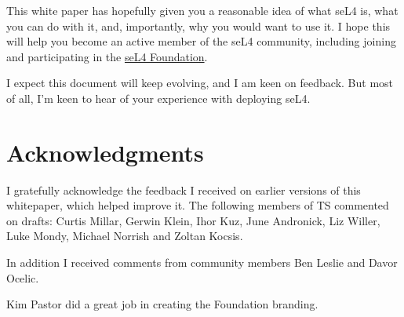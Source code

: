 \documentclass[english,a4paper,12pt]{report}
\newcommand{\Acks}{\section*{Acknowledgments}}
\newcommand{\Acks}{\chapter*{Acknowledgments}}
\begin{document}
  This white paper has hopefully given you a reasonable idea of what
  seL4 is, what you can do with it, and, importantly, why you would
  want to use it. I hope this will help you become an active member of
  the seL4 community, including joining and participating in the
  \href{https://sel4.systems/Foundation}{seL4 Foundation}.

  I expect this document will keep evolving, and I am keen on
  feedback. But most of all, I'm keen to hear of your experience with
  deploying seL4.


  \Acks

  I gratefully acknowledge the feedback I received on earlier versions
  of this whitepaper, which helped improve it. The following members of TS commented on drafts:
  Curtis Millar,
  Gerwin Klein,
  Ihor Kuz,
  June Andronick,
  Liz Willer,
  Luke Mondy,
  Michael Norrish and
  Zoltan Kocsis.

  In addition I received comments from community members
  Ben Leslie and
  Davor Ocelic.

  Kim Pastor did a great job in creating the Foundation branding.
  \cleardoublepage
  \sloppy
  
  
\end{document}
